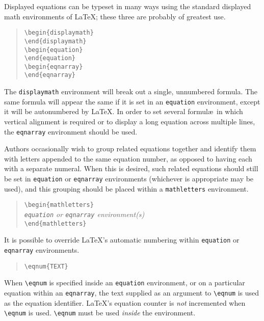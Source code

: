 Displayed equations can be typeset in many ways using the standard
displayed math environments of \LaTeX;
these three are probably of greatest use.
\begin{quote}
\verb"\begin{displaymath}"\\
\verb"\end{displaymath}"\\[.5ex]
\verb"\begin{equation}"\\
\verb"\end{equation}"\\[.5ex]
\verb"\begin{eqnarray}"\\
\verb"\end{eqnarray}"
\end{quote}
The {\tt displaymath} environment will break out a single,
unnumbered formula.  The same formula will appear the same if it
is set in an {\tt equation} environment, except it will be
autonumbered by \LaTeX.
In order to set several formul\ae\ in which vertical alignment
is required or to display a long equation across multiple lines, the 
{\tt eqnarray} environment should be used.

Authors occasionally wish to group related equations together and
identify them with letters appended to the same equation number,
as opposed to having each with a separate numeral.
When this is desired, such related equations should still be set
in {\tt equation} or {\tt eqnarray} environments (whichever is
appropriate may be used), and this grouping should be placed within
a {\tt mathletters} environment.
\begin{quote}
\verb"\begin{mathletters}"\\
{\it {\tt equation} or {\tt eqnarray} environment(s)\/}\\
\verb"\end{mathletters}"
\end{quote}

It is possible to override \LaTeX's automatic numbering within
{\tt equation} or {\tt eqnarray} environments.
\begin{quote}
\verb"\eqnum{TEXT}"
\end{quote}
When \verb"\eqnum" is specified inside an {\tt equation} environment,
or on a particular equation within an {\tt eqnarray}, the text supplied
as an argument to \verb"\eqnum" is used as the equation identifier.
\LaTeX's equation counter is {\sl not\/} incremented when \verb"\eqnum"
is used.
\verb"\eqnum" must be used {\sl inside\/} the environment.

